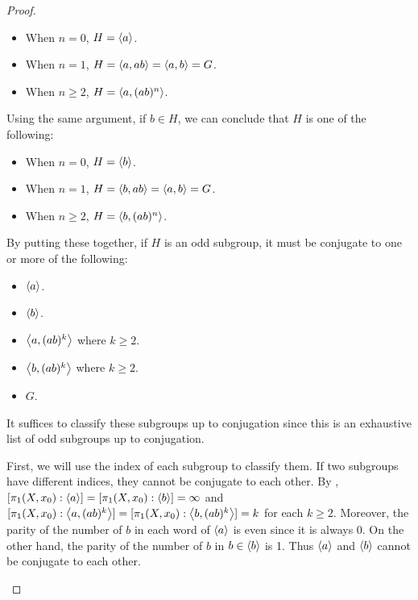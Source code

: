 \documentclass[12pt, psamsfonts]{amsart}
\theoremstyle{definition}
\theoremstyle{remark}
\numberwithin{equation}{section}
\begin{document}
\begin{proof}
\begin{itemize}
      \begin{itemize}
        \item
          When $n = 0$, $H = \ev{a}$.
        \item
          When $n = 1$, $H = \ev{a, ab} = \ev{a, b} = G$.
        \item
          When $n \geq 2$, $H = \ev{a, (ab)^n}$.
      \end{itemize}

      Using the same argument, if $b \in H$, we can conclude that $H$ is one of the following:
      \begin{itemize}
        \item
          When $n = 0$, $H = \ev{b}$.
        \item
          When $n = 1$, $H = \ev{b, ab} = \ev{a, b} = G$.
        \item
          When $n \geq 2$, $H = \ev{b, (ab)^n}$.
      \end{itemize}

      By putting these together, if $H$ is an odd subgroup, it must be conjugate to one or more of the following:
      \begin{itemize}
        \item
          $\ev{a}$.
        \item
          $\ev{b}$.
        \item
          $\ev{a, (ab)^k}$ where $k \geq 2$.
        \item
          $\ev{b, (ab)^k}$ where $k \geq 2$.
        \item
          $G$.
      \end{itemize}
      It suffices to classify these subgroups up to conjugation since this is an exhaustive list of odd subgroups up to conjugation.

      First, we will use the index of each subgroup to classify them.
      If two subgroups have different indices, they cannot be conjugate to each other.
      By , $[\pi_1(X, x_0): \ev{a}] = [\pi_1(X, x_0): \ev{b}] = \infty$ and $[\pi_1(X, x_0): \ev{a, (ab)^k}] = [\pi_1(X, x_0): \ev{b, (ab)^k}] = k$ for each $k \geq 2$.
      Moreover, the parity of the number of $b$ in each word of $\ev{a}$ is even since it is always 0.
      On the other hand, the parity of the number of $b$ in $b \in \ev{b}$ is 1.
      Thus $\ev{a}$ and $\ev{b}$ cannot be conjugate to each other.


\end{itemize}
\end{proof}
\end{document}
